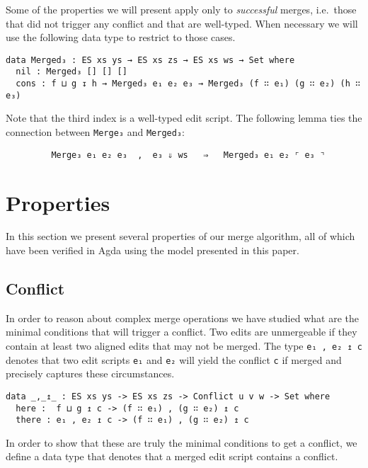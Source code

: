 \documentclass[preprint]{sigplanconf}
\begin{document}
        Some of the properties we will present apply only to \emph{successful} 
        merges, i.e.\ those that did not trigger any conflict and that are 
        well-typed. When necessary we will use the following data type to restrict
        to those cases.

\begin{verbatim}
data Merged₃ : ES xs ys → ES xs zs → ES xs ws → Set where  
  nil : Merged₃ [] [] []
  cons : f ⊔ g ↧ h → Merged₃ e₁ e₂ e₃ → Merged₃ (f ∷ e₁) (g ∷ e₂) (h ∷ e₃)
\end{verbatim}
        Note that the third index is a well-typed edit script.
        The following lemma ties the connection between \texttt{Merge₃} and 
        \texttt{Merged₃}:
\begin{verbatim}
         Merge₃ e₁ e₂ e₃  ,  e₃ ⇓ ws   ⇒   Merged₃ e₁ e₂ ⌜ e₃ ⌝
\end{verbatim}

\section{Properties}
\label{sec:properties}
In this section we present several properties of our merge algorithm, all of which 
have been verified in Agda using the model presented in this paper.

    \subsection{Conflict}  
    In order to reason about complex merge operations we have studied what are the 
    minimal conditions that will trigger a conflict.
    Two edits are unmergeable if they contain at least two aligned edits that 
    may not be merged.
    The type \texttt{e₁ , e₂  ↥ c} denotes that two edit scripts \texttt{e₁} and 
    \texttt{e₂} will yield the conflict \texttt{c} if merged and precisely
    captures these circumstances.

\begin{verbatim}
data _,_↥_ : ES xs ys -> ES xs zs -> Conflict u v w -> Set where
  here :  f ⊔ g ↥ c -> (f ∷ e₁) , (g ∷ e₂) ↥ c
  there : e₁ , e₂ ↥ c -> (f ∷ e₁) , (g ∷ e₂) ↥ c
\end{verbatim}

    In order to show that these are truly the minimal conditions to get a conflict,
    we define a data type that denotes that a merged edit script contains a 
    conflict. 
\end{document}
